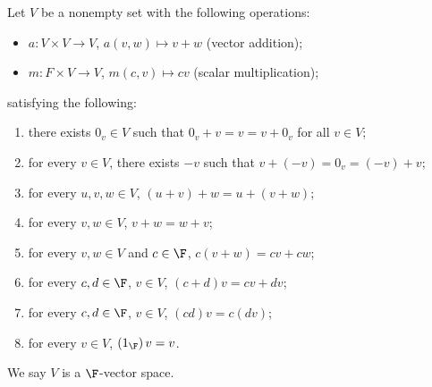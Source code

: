 \documentclass[10pt]{mypackage}
\begin{document}
\begin{definition}
  Let $V$ be a nonempty set with the following operations:
  \begin{itemize}
    \item $a: V\times V \rightarrow V$, $a(v,w)\mapsto v+w$ (vector addition);
    \item $m: F\times V \rightarrow V$, $m(c,v) \mapsto cv$ (scalar multiplication);
  \end{itemize}
  satisfying the following:
  \begin{enumerate}[(1)]
    \item there exists $0_v\in V$ such that $0_v + v = v = v + 0_v$ for all $v\in V$;
    \item for every $v\in V$, there exists $-v$ such that $v + (-v) = 0_v = (-v) + v$;
    \item for every $u,v,w\in V$, $(u+v) + w = u + (v+w)$;
    \item for every $v,w\in V$, $v+w = w+v$;
    \item for every $v,w\in V$ and $c\in \F$, $c(v+w) = cv + cw$;
    \item for every $c,d\in \F$, $v\in V$, $(c+d)v = cv + dv$;
    \item for every $c,d\in \F$, $v\in V$, $(cd)v = c(dv)$;
    \item for every $v\in V$, $\left(1_{\F}\right)v = v$.
  \end{enumerate}
  We say $V$ is a $\F$-vector space.
\end{definition}
\end{document}
